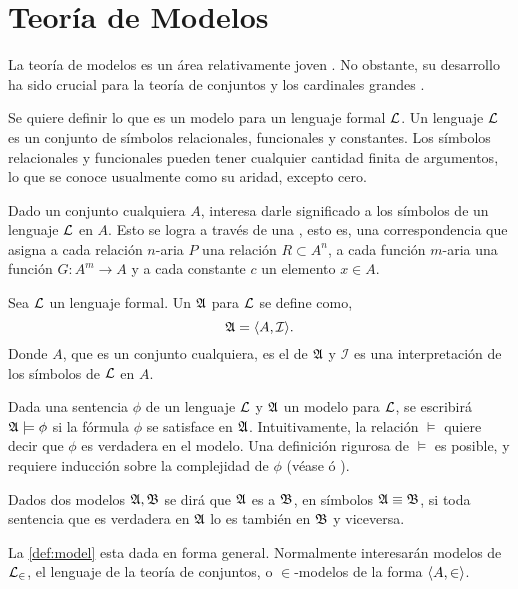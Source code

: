 \section{Teoría de Modelos}
\label{sec:models}

La teoría de modelos es un área relativamente joven \autocite[pág. 3]{chang_model_2012}.
No obstante, su desarrollo ha sido crucial para la teoría de conjuntos y los
cardinales grandes \autocite[pág. xv]{kanamori_higher_2009}.

Se quiere definir lo que es un modelo para un lenguaje formal $\mathcal { L }$.
Un lenguaje $\mathcal { L }$ es un conjunto de símbolos relacionales, funcionales y constantes.
Los símbolos relacionales y funcionales pueden tener cualquier cantidad finita de argumentos,
lo que se conoce usualmente como su aridad, excepto cero.

Dado un conjunto cualquiera $A$, interesa darle significado a los símbolos de un
lenguaje $\mathcal { L }$ en $A$. Esto se logra a través de una , esto es,
una correspondencia que asigna a cada relación $n$-aria $P$ una relación
$R\subset A^n$, a cada función $m$-aria una función $G\colon A^m\to A$ y a cada
constante $c$ un elemento $x\in A$.

\begin{defi}\label{def:model}
    Sea $\mathcal { L }$ un lenguaje formal. Un  $\mathfrak { A }$ para $\mathcal { L }$ se define como,
    \[
        \mathfrak { A } = \langle A, \mathcal{I} \rangle.
    \]
    Donde $A$, que es un conjunto cualquiera, es el  de $\mathfrak { A }$ y
    $\mathcal{I}$ es una interpretación de los símbolos de $\mathcal { L }$ en $A$.
\end{defi}

Dada una sentencia $\phi$ de un lenguaje $\mathcal { L }$ y $\mathfrak { A }$ un modelo para $\mathcal { L }$,
se escribirá $\mathfrak { A }\models\phi$ si la fórmula $\phi$ se satisface en $\mathfrak { A }$.
Intuitivamente, la relación $\models$ quiere decir que $\phi$ es verdadera en el modelo.
Una definición rigurosa de $\models$ es posible, y requiere inducción sobre la complejidad
de $\phi$ (véase \autocite[\S 1.3]{chang_model_2012} ó \autocite[\S 12]{jech_set_2003}).

Dados dos modelos $\mathfrak { A }, \mathfrak { B }$ se dirá que $\mathfrak { A }$ es  a $\mathfrak { B }$, en símbolos $\mathfrak { A }\equiv \mathfrak { B }$, si toda sentencia
que es verdadera en $\mathfrak { A }$ lo es también en $\mathfrak { B }$ y viceversa.

La \cref{def:model} esta dada en forma general. Normalmente interesarán modelos de $\mathcal { L }_\in$,
el lenguaje de la teoría de conjuntos, o $\in$-modelos de la forma $\langle A,\in \rangle$.

